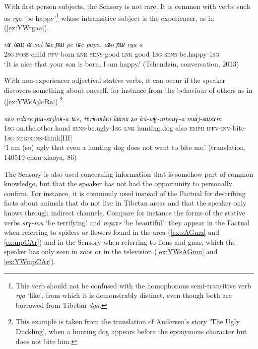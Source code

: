 \documentclass[11pt]{article}
\newcommand{\ipa}[1]{{\phon\textit{#1}}} %
\newcommand{\refb}[1]{(\ref{#1})}
\begin{document}
With first person subjects, the Sensory is not rare. It is common with verbs such as \ipa{rga} `be happy'\footnote{This verb should not be confused with the homophonous semi-transitive verb \ipa{rga} `like', from which it is demonstrably distinct, even though both are borrowed from Tibetan \ipa{dga}.} whose intransitive subject is the experiencer, as in \refb{ex:YWrgaa}.

\begin{exe}
\ex \label{ex:YWrgaa}
\gll 
 \ipa{nɤ-tɕɯ}  \ipa{tɤ-sci}  \ipa{tɕe}  \ipa{ɲɯ-pe}  \ipa{tɕe}  \ipa{papa,}  \ipa{aʑo} \ipa{ɲɯ-rga-a} \\
 \textsc{2sg.poss}-child \textsc{pfv}-born \textsc{lnk} \textsc{sens}-good \textsc{lnk} good  \textsc{1sg} \textsc{sens}-be.happy-\textsc{1sg} \\
\glt `It is nice that your son is born, I am happy.' (Tshendzin, conversation, 2013)
\end{exe}

With non-experiencer adjectival stative verbs, it can occur if the speaker discovers something about oneself, for instance from the behaviour of others as in \refb{ex:YWsAjloRa}.\footnote{This example is taken from the translation of Andersen's story `The Ugly Duckling', when a hunting dog appears before the eponymous character but does not bite him. }

\begin{exe}
\ex \label{ex:YWsAjloRa}
\gll 
\ipa{aʑo} 	\ipa{ndɤre} 	\ipa{ɲɯ-sɤjloʁ-a} 	\ipa{tɕe,} \ipa{tɤrʁaʁkɕi} 	\ipa{kɯnɤ} 	\ipa{ʑo} 	\ipa{kú-wɣ-mtsɯɣ-a} 	\ipa{mɯ́j-sɯsɤm} \\
\textsc{1sg} on.the.other.hand \textsc{sens}-be.ugly-\textsc{1sg} \textsc{lnk} hunting.dog also \textsc{emph} \textsc{ipfv-inv}-bite-\textsc{1sg} \textsc{neg:sens}-think[III] \\
\glt `I am (so) ugly that even a hunting dog does not want to bite me.'  (translation, 140519 chou xiaoya, 86)
\end{exe}

The Sensory is also used concerning information that is somehow part of common knowledge, but that the speaker has not had the opportunity to personally confirm. For instance, it is commonly used instead of the Factual for describing facts about animals that do not live in Tibetan areas and that the speaker only knows through indirect channels. Compare for instance the forms of the stative verbs \ipa{sɤɣ-mu} `be terrifying' and \ipa{mpɕɤr} `be beautiful': they appear in the Factual when referring to  spiders or flowers found in the area (\ref{ex:sAGmu} and \ref{ex:mpCAr}) and in the Sensory when referring to lions and gnus, which the speaker has only seen in zoos or in the television  (\ref{ex:YWsAGmu} and \ref{ex:YWmpCAr}).
 
\end{document}
